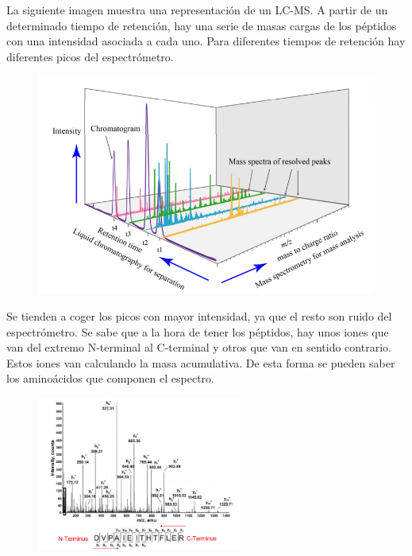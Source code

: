 La siguiente imagen muestra una representación de un LC-MS. A partir de un determinado tiempo de retención, hay una serie de masas cargas de los péptidos con una intensidad asociada a cada uno. Para diferentes tiempos de retención hay diferentes picos del espectrómetro.

\begin{figure}[h]
\centering
\includegraphics[width = \textwidth]{figs/lc-ms.png}
\end{figure}

Se tienden a coger los picos con mayor intensidad, ya que el resto son ruido del espectrómetro. Se sabe que a la hora de tener los péptidos, hay unos iones que van del extremo N-terminal al C-terminal y otros que van en sentido contrario. Estos iones van calculando la masa acumulativa. De esta forma se pueden saber los aminoácidos que componen el espectro.

\begin{figure}[h]
\centering
\includegraphics[width = 0.6\textwidth]{figs/fragmentacion-msms.png}
\end{figure}

